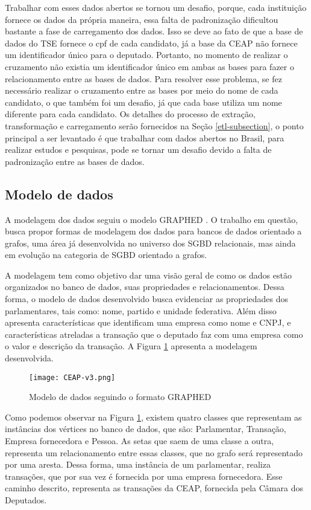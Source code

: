 Trabalhar com esses dados abertos se tornou um desafio, porque, cada instituição fornece os dados da própria maneira, essa falta de padronização dificultou bastante a fase de carregamento dos dados. Isso se deve ao fato de que a base de dados do TSE fornece o cpf de cada candidato, já a base da CEAP não fornece um identificador único para o deputado. Portanto, no momento de realizar o cruzamento não existia um identificador único em ambas as bases para fazer o relacionamento entre as bases de dados. Para resolver esse problema, se fez necessário realizar o cruzamento entre as bases por meio do nome de cada candidato, o que também foi um desafio, já que cada base utiliza um nome diferente para cada candidato. Os detalhes do processo de extração, transformação e carregamento serão fornecidos na Seção \ref{etl-subsection}, o ponto principal a ser levantado é que trabalhar com dados abertos no Brasil, para realizar estudos e pesquisas, pode se tornar um desafio devido a falta de padronização entre as bases de dados. 

\subsection{Modelo de dados}

A modelagem dos dados seguiu o modelo GRAPHED \cite{graphed}. O trabalho em questão, busca propor formas de modelagem dos dados para bancos de dados orientado a grafos, uma área já desenvolvida no universo dos SGBD relacionais, mas ainda em evolução na categoria de SGBD orientado a grafos.

A modelagem tem como objetivo dar uma visão geral de como os dados estão organizados no banco de dados, suas propriedades e relacionamentos. Dessa forma, o modelo de dados desenvolvido busca evidenciar as propriedades dos parlamentares, tais como: nome, partido e unidade federativa. Além disso apresenta características que identificam uma empresa como nome e CNPJ, e características atreladas a transação que o deputado faz com uma empresa como o valor e descrição da transação. A Figura \ref{fig:modeloDeDados} apresenta a modelagem  desenvolvida.

\begin{figure}[H]
\centering
\texttt{[image: CEAP-v3.png]}
\caption{Modelo de dados seguindo o formato GRAPHED}
\label{fig:modeloDeDados}
\end{figure}

Como podemos observar na Figura \ref{fig:modeloDeDados}, existem quatro classes que representam as instâncias dos vértices no banco de dados, que são: Parlamentar, Transação, Empresa fornecedora e Pessoa. As setas que saem de uma classe a outra, representa um relacionamento entre essas classes, que no grafo será representado por uma aresta. Dessa forma, uma instância de um parlamentar, realiza transações, que por sua vez é fornecida por uma empresa fornecedora. Esse caminho descrito, representa as transações da CEAP, fornecida pela Câmara dos Deputados.

